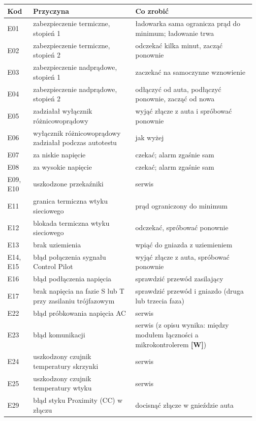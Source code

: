 \documentclass[11pt,a4paper]{article}
\newcommand{\tagW}{\textcolor{apamber}{\textbf{[W]}}}
\begin{document}
\begin{longtable}{p{1.6cm}p{5.4cm}p{9.2cm}}
\toprule
\textbf{Kod} & \textbf{Przyczyna} & \textbf{Co zrobić} \\
\midrule
\endhead
E01 & zabezpieczenie termiczne, stopień 1 & ładowarka sama ogranicza prąd do minimum; ładowanie trwa \\
E02 & zabezpieczenie termiczne, stopień 2 & odczekać kilka minut, zacząć ponownie \\
E03 & zabezpieczenie nadprądowe, stopień 1 & zaczekać na samoczynne wznowienie \\
E04 & zabezpieczenie nadprądowe, stopień 2 & odłączyć od auta, podłączyć ponownie, zacząć od nowa \\
E05 & zadziałał wyłącznik różnicowoprądowy & wyjąć złącze z auta i spróbować ponownie \\
E06 & wyłącznik różnicowoprądowy zadziałał podczas autotestu & jak wyżej \\
E07 & za niskie napięcie & czekać; alarm zgaśnie sam \\
E08 & za wysokie napięcie & czekać; alarm zgaśnie sam \\
E09, E10 & uszkodzone przekaźniki & serwis \\
E11 & granica termiczna wtyku sieciowego & prąd ograniczony do minimum \\
E12 & blokada termiczna wtyku sieciowego & odczekać, spróbować ponownie \\
E13 & brak uziemienia & wpiąć do gniazda z uziemieniem \\
E14, E15 & błąd połączenia sygnału Control Pilot & wyjąć złącze z auta, spróbować ponownie \\
E16 & błąd podłączenia napięcia & sprawdzić przewód zasilający \\
E17 & brak napięcia na fazie S lub T przy zasilaniu trójfazowym & sprawdzić przewód i gniazdo (druga lub trzecia faza) \\
E22 & błąd próbkowania napięcia AC & serwis \\
E23 & błąd komunikacji & serwis (z opisu wynika: między modułem łączności a mikrokontrolerem \tagW) \\
E24 & uszkodzony czujnik temperatury skrzynki & serwis \\
E25 & uszkodzony czujnik temperatury wtyku & serwis \\
E29 & błąd styku Proximity (CC) w złączu & docisnąć złącze w gnieździe auta \\
\bottomrule
\end{longtable}
\end{document}
